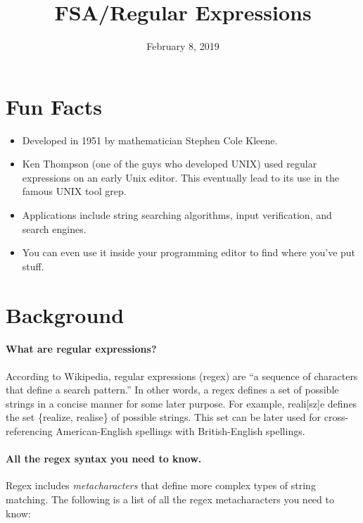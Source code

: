 \documentclass{pset_template}
\title{FSA/Regular Expressions}
\date{February 8, 2019}
\begin{document}
\maketitle

\section{Fun Facts}
\begin{itemize}
\item Developed in 1951 by mathematician Stephen Cole Kleene.
\item Ken Thompson (one of the guys who developed UNIX) used regular expressions on an early Unix editor.
This eventually lead to its use in the famous UNIX tool grep.
\item Applications include string searching algorithms,  input verification, and search engines.
\item You can even use it inside your programming editor to find where you've put stuff.
\end{itemize}

\section{Background}
\paragraph{What are regular expressions?}
According to Wikipedia, regular expressions (regex) are ``a sequence of characters that define a search pattern.''
In other words, a regex defines a set of possible strings in a concise manner for
some later purpose.
For example, reali[sz]e defines the set \{realize, realise\} of possible strings.
This set can be later used for cross-referencing American-English spellings with
British-English spellings.

\paragraph{All the regex syntax you need to know.}
Regex includes \textit{metacharacters} that define more complex types
of string matching.
The following is a list of all the regex metacharacters you need to know:
\end{document}
